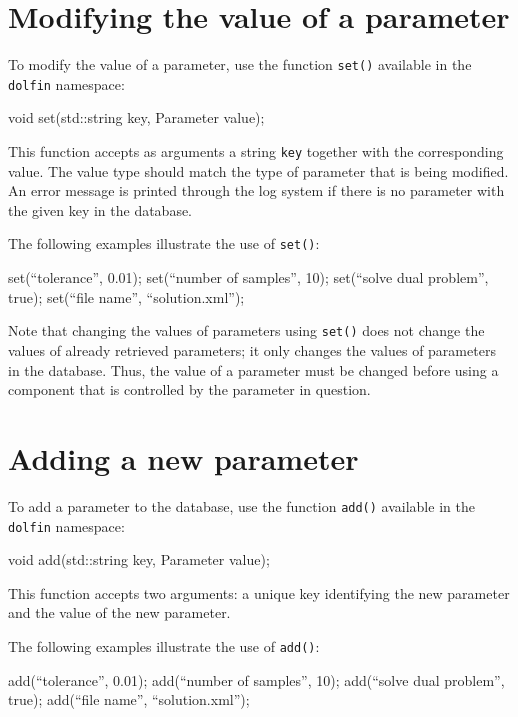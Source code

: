 \section{Modifying the value of a parameter}

To modify the value of a parameter, use the function \texttt{set()}
available in the \texttt{dolfin} namespace:
\begin{code}
void set(std::string key, Parameter value);
\end{code}
This function accepts as arguments a string \texttt{key} together with
the corresponding value. The value type should match the type of
parameter that is being modified. An error message is
printed through the log system if there is no parameter with the given
key in the database.

The following examples illustrate
the use of \texttt{set()}:
\begin{code}
set(``tolerance'', 0.01);
set(``number of samples'', 10);
set(``solve dual problem'', true);
set(``file name'', ``solution.xml'');
\end{code}

Note that changing the values of parameters using
\texttt{set()} does not change the values of already retrieved
parameters; it only changes the values of parameters in the
database. Thus, the value of a parameter must be changed before using
a component that is controlled by the parameter in question.

\section{Adding a new parameter}

To add a parameter to the database, use the function
\texttt{add()} available in the \texttt{dolfin}
namespace:
\begin{code}
void add(std::string key, Parameter value);
\end{code}
This function accepts two arguments:
a unique key identifying the new parameter and the value of the new
parameter.

The following examples illustrate the use of
\texttt{add()}:
\begin{code}
add(``tolerance'', 0.01);
add(``number of samples'', 10);
add(``solve dual problem'', true);
add(``file name'', ``solution.xml'');
\end{code}

